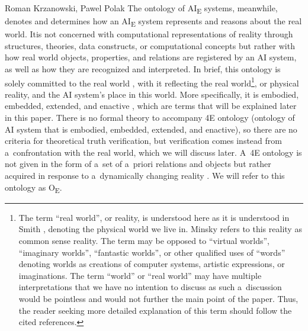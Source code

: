 \begin{artengenv2auth}{Roman Krzanowski, Pawel Polak}
The ontology of AI\textsubscript{E} systems, meanwhile, denotes and determines how an AI\textsubscript{E} system represents and reasons about the real world. Itis not concerned with computational representations of reality through structures, theories, data constructs, or computational concepts but rather with how real world objects, properties, and relations are registered by an AI system, as well as how they are recognized and interpreted. In brief, this ontology is solely committed to the real world
\parencite[in the sense explained by][p.145]{smith_promise_2019}, %
 with it reflecting the real world\footnote{The term ``real world'', or reality, is understood here as it is understood in Smith 
\parencite*[][xiv]{smith_promise_2019}, %
 denoting the physical world we live in. Minsky 
\parencite*[][p.6]{minsky_logical_1991} %
 refers to this reality as common sense reality. The term may be opposed to ``virtual worlds'', ``imaginary worlds'', ``fantastic worlds'', or other qualified uses of ``words'' denoting worlds as creations of computer systems, artistic expressions, or imaginations. The term ``world'' or ``real world'' may have multiple interpretations that we have no intention to discuss as such a~discussion would be pointless and would not further the main point of the paper. Thus, the reader seeking more detailed explanation of this term should follow the cited references.}, or physical reality, and the AI system's place in this world. More specifically, it is embodied, embedded, extended, and enactive 
\parencite[][p.43]{smith_promise_2019}, %
 which are terms that will be explained later in this paper. There is no formal theory to accompany 4E ontology (ontology of AI system that is embodied, embedded, extended, and enactive), so there are no criteria for theoretical truth verification, but verification comes instead from a~confrontation with the real world, which we will discuss later. A~4E ontology is not given in the form of a~set of a~priori relations and objects but rather acquired 
\parencite[][]{smith_promise_2019} %
 in response to a~dynamically changing reality 
\parencites[see][as well as]{minsky_logical_1991}[][]{boltuc_conscious_2020}. %
 We will refer to this ontology as O\textsubscript{E}.


\end{artengenv2auth}
